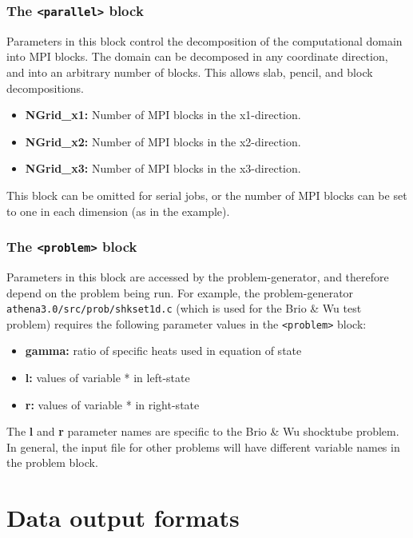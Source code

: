 \subsubsection{The {\tt <parallel>} block}

Parameters in this block control the decomposition of the computational
domain into MPI blocks.  The domain can be decomposed in any coordinate
direction, and into an arbitrary number of blocks.  This allows slab, pencil,
and block decompositions.
\begin{itemize}
\item {\bf NGrid\_x1:} Number of MPI blocks in the x1-direction.
\item {\bf NGrid\_x2:} Number of MPI blocks in the x2-direction.
\item {\bf NGrid\_x3:} Number of MPI blocks in the x3-direction.
\end{itemize}
This block can be omitted for serial jobs, or
the number of MPI blocks can be set to one in each dimension (as in the
example).

\subsubsection{The {\tt <problem>} block}

Parameters in this block are accessed by the problem-generator,
and therefore depend on the problem being run.  For example, the 
problem-generator {\tt athena3.0/src/prob/shkset1d.c}
(which is used for the Brio \& Wu test problem)
requires the following parameter values in the {\tt <problem>} block:
\begin{itemize}
\item {\bf gamma:} ratio of specific heats used in equation of state
\item {\bf *l:} values of variable * in left-state
\item {\bf *r:} values of variable * in right-state
\end{itemize}
The {\bf *l} and {\bf *r} parameter names are specific to the Brio \&
Wu shocktube problem.  In general, the input file for other problems
will have different variable names in the problem block.

\section{Data output formats}

